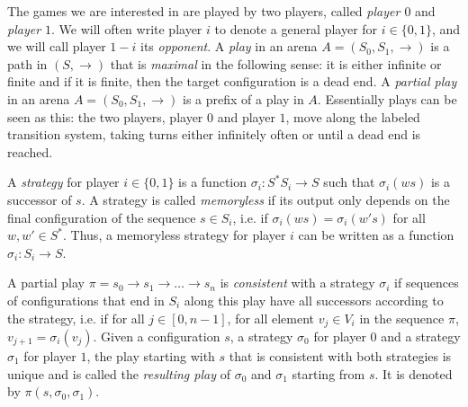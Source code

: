 \documentclass[a4paper,UKenglish,cleveref, autoref, thm-restate]{lipics-v2021}
\begin{document}
\noindent
The games we are interested in are played by two players, called {\em player $0$} and {\em player $1$}. We will often write player $i$ to denote a general player for $i \in \{0,1 \}$,
and we will call player $1-i$ its {\em opponent}. 
A {\em play} in an arena $A=(S_0,S_1,\rightarrow)$ is a path in $(S,{\rightarrow})$ that is {\em maximal} in the following sense: it is either infinite or finite and if it is finite, then the target configuration is a dead end. 
A {\em partial play} in an arena $A=(S_0,S_1,\rightarrow)$ is a 
prefix of a play in $A$.
Essentially plays can be seen as this: the two players, player $0$ and player $1$, move along the labeled transition system, taking turns either inﬁnitely often or until a dead end is reached.




A {\em strategy} for player $i \in \{ 0,1\}$ is a function $\sigma_i : S^* S_i \to S$ such
that $\sigma_i(ws)$ is a successor of $s$.
%
A strategy is called {\em memoryless} if its output only depends on the final configuration of the sequence $s \in S_i$, i.e. if $\sigma_i(ws) = \sigma_i(w's)$ for all $w,w' \in S^*$. Thus, a memoryless strategy for player $i$ can be written  as a function $\sigma_i: S_i \to S$.

A partial play $\pi = s_0 \rightarrow s_1 \rightarrow \ldots \rightarrow s_n$ is {\em consistent} with a strategy $\sigma_i$ if sequences of configurations that end in $S_i$ along this play have all successors according to the strategy, i.e.
if for all $j\in[0,n-1]$, for all element $v_j \in V_i$ in the sequence $\pi$,
$v_{j+1} = \sigma_i(v_j)$.
 Given a configuration $s$,   a strategy $\sigma_0$ for player $0$ and a strategy $\sigma_1$ for player $1$, the play starting with $s$ that is consistent with both strategies is unique and is called the {\em resulting play} of $\sigma_0$ and $\sigma_1$ starting from $s$. It is 
denoted by $\pi(s, \sigma_0, \sigma_1)$.

\end{document}
